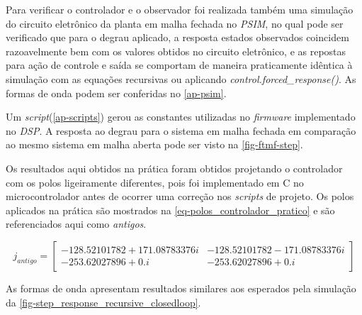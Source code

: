 \documentclass[
	12pt,				%
	article,			%
	openright,			%
	oneside,
	a4paper,			%
	chapter=TITLE,		%
	section=TITLE,		%
	english,			%
	french,				%
	spanish,			%
	brazil,				%
]{abntex2}
\begin{document}
        	    Para verificar o controlador e o observador foi realizada também uma simulação do circuito eletrônico da planta em malha fechada no \textit{PSIM}, no qual pode ser verificado que para o degrau aplicado, a resposta estados observados coincidem razoavelmente bem com os valores obtidos no circuito eletrônico, e as repostas para ação de controle e saída se comportam de maneira praticamente idêntica à simulação com as equações recursivas ou aplicando \textit{control.forced\_response()}. As formas de onda podem ser conferidas no \autoref{ap-psim}.
            
                Um \textit{script}(\autoref{ap-scripts}) gerou as constantes utilizadas no \textit{firmware} implementado no \textit{DSP}. A resposta ao degrau para o sistema em malha fechada em comparação ao mesmo sistema em malha aberta pode ser visto na \autoref{fig-ftmf-step}.
                
                Os resultados aqui obtidos na prática foram obtidos projetando o controlador com os polos ligeiramente diferentes, pois foi implementado em C no microcontrolador antes de ocorrer uma correção nos \textit{scripts} de projeto. Os polos aplicados na prática são mostrados na \autoref{eq-polos_controlador_pratico} e são referenciados aqui como \textit{antigos}.

                \begin{equation}
                    \label{eq-polos_controlador_pratico}
                    j_{antigo} = \begin{bmatrix}
                        -128.52101782 +171.08783376i & -128.52101782 -171.08783376i \\
                        -253.62027896  +0.i         & -253.62027896  +0.i    
                    \end{bmatrix}
                \end{equation}
                
                As formas de onda apresentam resultados similares aos esperados pela simulação da \autoref{fig-step_response_recursive_closedloop}.
                
\end{document}

